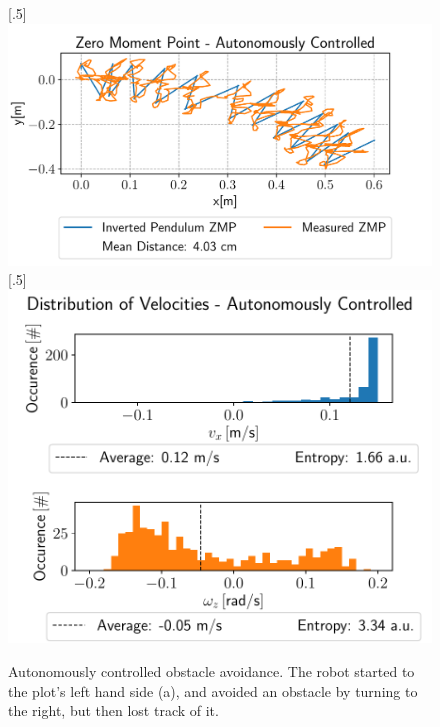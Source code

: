 \begin{figure}[h!]
	[.5\linewidth]{\includegraphics[scale=.45]{chapters/04_experiments/02_autonomous_walking/obstacle_walk_02_zmp.pdf}}
	[.5\linewidth]{\includegraphics[scale=.45]{chapters/04_experiments/02_autonomous_walking/obstacle_walk_02_entropy.pdf}}
	\caption{Autonomously controlled obstacle avoidance. The robot started to the plot's left hand side (a), and avoided an obstacle by turning to the right, but then lost track of it.}
\label{fig::424_aw_basic_obstacle}
\end{figure}
